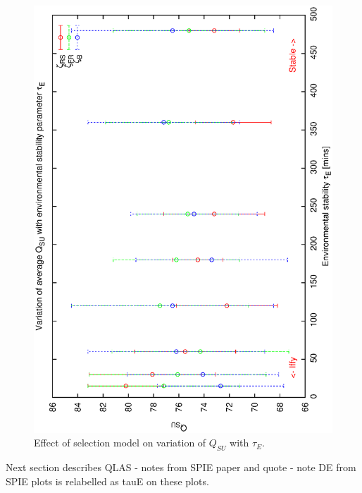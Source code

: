 \begin{figure}[h]
 \label{fig:qsu_de_allcomp}
\begin{center}
 \includegraphics[scale=0.5, angle=-90]{figures/all_de.eps}
 \caption[Effect of selection model on variation of $Q_{SU}$ with $\tau_E$.] 
   {Effect of selection model on variation of $Q_{SU}$ with $\tau_E$.}
\end{center}
\end{figure}

Next section describes QLAS - notes from SPIE paper and quote - note DE from SPIE plots is relabelled as tauE on these plots.



